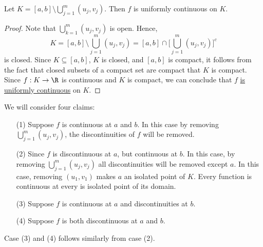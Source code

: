 \begin{lemma}[Claim 2]
    Let \( K = [a,b] \setminus  \bigcup_{ j=1 }^{ m } ({u}_{j}, {v}_{j})  \). Then \( f \) is uniformly continuous on \( K  \).
\end{lemma}
\begin{proof}
Note that \( \bigcup_{ k=1  }^{ m } ({u}_{j}, {v}_{j})   \) is open. Hence, 
\[  K = [a,b] \setminus  \bigcup_{ j=1  }^{ m }  ({u}_{j}, {v}_{j}) = [a,b] \cap \Big[ \bigcup_{ j=1  }^{ m }  ({u}_{j}, {v}_{j}) \Big]^{c} \]
is closed. Since \( K \subseteq  [a,b] \), \( K  \) is closed, and \( [a,b]  \) is compact, it follows from the fact that closed subsets of a compact set are compact that \( K  \) is compact. Since \( f: K \to \R  \) is continuous and \( K  \) is compact, we can conclude that \( f  \) {\hyperref[is uniformly continuous]{is uniformly continuous}} on \( K  \).
\end{proof}

\begin{remark}\label{is uniformly continuous}
   We will consider four claims:
   \begin{enumerate}
       \item[(1)] Suppose \( f  \) is continuous at \( a \) and \( b  \). In this case by removing \( \bigcup_{ j=1  }^{ m }  ({u}_{j}, {v}_{j})  \), the discontinuities of \( f  \) will be removed.
        \item[(2)] Since \( f  \) is discontinuous at \( a \), but continuous at \( b  \). In this case, by removing \( \bigcup_{ j=1 }^{ m } ({u}_{j},{v}_{j}) \) all discontinuities will be removed except \( a \). In this case, removing \( ({u}_{1}, {v}_{1}) \) makes \( a \) an isolated point of \( K  \). Every function is continuous at every is isolated point of its domain.
        \item[(3)] Suppose \( f \) is continuous at \( a \) and discontinuities at \( b \).
        \item[(4)] Suppose \( f \) is both discontinuous at \( a \) and \( b \).
   \end{enumerate}
   Case (3) and (4) follows similarly from case (2).
\end{remark}

